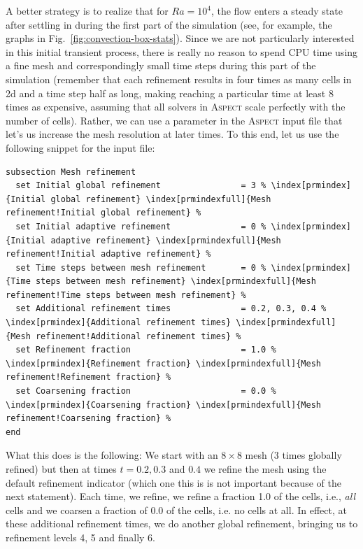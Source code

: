 \documentclass{article}
\newcommand{\aspect}{\textsc{Aspect}}
\begin{document}
A better strategy is to realize that for $Ra=10^4$, the flow enters a steady
state after settling in during the first part of the simulation (see, for
example, the graphs in Fig.~\ref{fig:convection-box-stats}). Since we are not
particularly interested in this initial transient process, there is really no
reason to spend CPU time using a fine mesh and correspondingly small time
steps during this part of the simulation (remember that each refinement results
in four times as many cells in 2d and a time step half as long, making reaching
a particular time at least 8 times as expensive, assuming that all solvers in
\aspect{} scale perfectly with the number of cells). Rather, we can use a
parameter in the \aspect{} input file that let's us increase the mesh resolution
at later times. To this end, let us use the following snippet for the input
file:
\begin{lstlisting}[frame=single,language=prmfile,escapechar=\%]
subsection Mesh refinement
  set Initial global refinement                = 3 % \index[prmindex]{Initial global refinement} \index[prmindexfull]{Mesh refinement!Initial global refinement} %
  set Initial adaptive refinement              = 0 % \index[prmindex]{Initial adaptive refinement} \index[prmindexfull]{Mesh refinement!Initial adaptive refinement} %
  set Time steps between mesh refinement       = 0 % \index[prmindex]{Time steps between mesh refinement} \index[prmindexfull]{Mesh refinement!Time steps between mesh refinement} %
  set Additional refinement times              = 0.2, 0.3, 0.4 % \index[prmindex]{Additional refinement times} \index[prmindexfull]{Mesh refinement!Additional refinement times} %
  set Refinement fraction                      = 1.0 % \index[prmindex]{Refinement fraction} \index[prmindexfull]{Mesh refinement!Refinement fraction} %
  set Coarsening fraction                      = 0.0 % \index[prmindex]{Coarsening fraction} \index[prmindexfull]{Mesh refinement!Coarsening fraction} %
end
\end{lstlisting}

What this does is the following: We start with an $8\times 8$ mesh (3 times
globally refined) but then at times $t=0.2,0.3$ and $0.4$ we refine the mesh
using the default refinement indicator (which one this is is not important
because of the next statement). Each time, we refine, we refine a fraction 1.0
of the cells, i.e., \textit{all} cells and we coarsen a fraction of 0.0 of the
cells, i.e. no cells at all. In effect, at these additional refinement times, we
do another global refinement, bringing us to refinement levels 4, 5 and finally
6.
\end{document}
